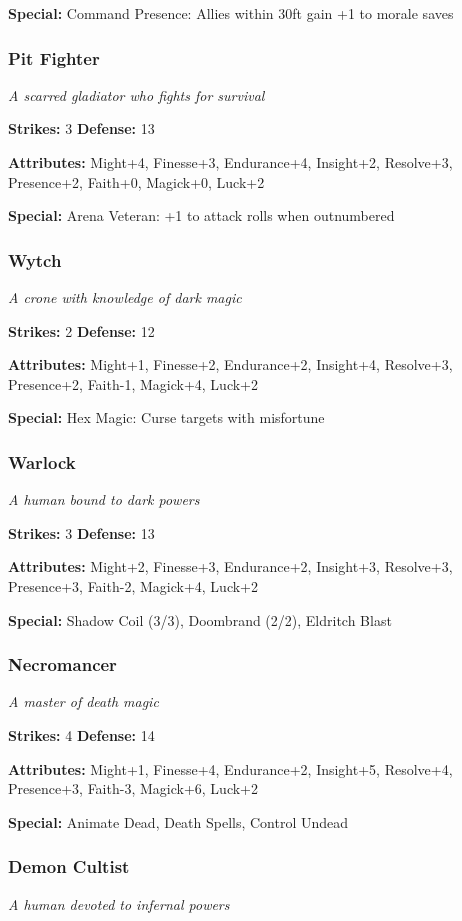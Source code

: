 \documentclass[10pt,twoside]{article}
\begin{document}
\textbf{Special:} Command Presence: Allies within 30ft gain +1 to morale saves

\subsubsection{Pit Fighter}
\textit{A scarred gladiator who fights for survival}

\textbf{Strikes:} 3 \quad \textbf{Defense:} 13

\textbf{Attributes:} Might+4, Finesse+3, Endurance+4, Insight+2, Resolve+3, Presence+2, Faith+0, Magick+0, Luck+2

\textbf{Special:} Arena Veteran: +1 to attack rolls when outnumbered

\subsubsection{Wytch}
\textit{A crone with knowledge of dark magic}

\textbf{Strikes:} 2 \quad \textbf{Defense:} 12

\textbf{Attributes:} Might+1, Finesse+2, Endurance+2, Insight+4, Resolve+3, Presence+2, Faith-1, Magick+4, Luck+2

\textbf{Special:} Hex Magic: Curse targets with misfortune

\subsubsection{Warlock}
\textit{A human bound to dark powers}

\textbf{Strikes:} 3 \quad \textbf{Defense:} 13

\textbf{Attributes:} Might+2, Finesse+3, Endurance+2, Insight+3, Resolve+3, Presence+3, Faith-2, Magick+4, Luck+2

\textbf{Special:} Shadow Coil (3/3), Doombrand (2/2), Eldritch Blast

\subsubsection{Necromancer}
\textit{A master of death magic}

\textbf{Strikes:} 4 \quad \textbf{Defense:} 14

\textbf{Attributes:} Might+1, Finesse+4, Endurance+2, Insight+5, Resolve+4, Presence+3, Faith-3, Magick+6, Luck+2

\textbf{Special:} Animate Dead, Death Spells, Control Undead

\subsubsection{Demon Cultist}
\textit{A human devoted to infernal powers}
\end{document}
